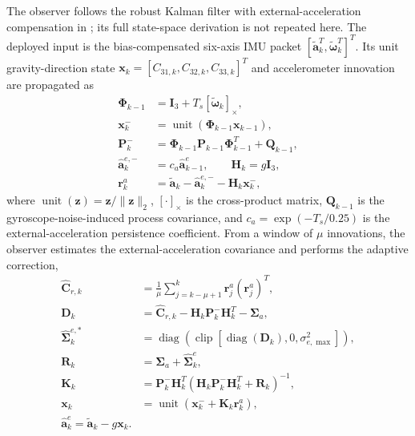\documentclass{ieeeaccess}
\newcommand{\citep}[1]{\cite{#1}}
\begin{document}
The observer follows the robust Kalman filter with external-acceleration compensation in \citep{Chen2024RobustAttitude}; its full state-space derivation is not repeated here. The deployed input is the bias-compensated six-axis IMU packet $[\tilde{\bm a}_k^{T},\tilde{\bm\omega}_k^{T}]^{T}$. Its unit gravity-direction state $\bm x_k=[C_{31,k},C_{32,k},C_{33,k}]^{T}$ and accelerometer innovation are propagated as
\begin{equation}
\begin{aligned}
\bm\Phi_{k-1}&=\bm I_3+T_s[\tilde{\bm\omega}_k]_{\times},\\
\bm x_k^{-}&=\operatorname{unit}(\bm\Phi_{k-1}\bm x_{k-1}),\\
\bm P_k^{-}&=\bm\Phi_{k-1}\bm P_{k-1}\bm\Phi_{k-1}^{T}+\bm Q_{k-1},\\
\hat{\bm a}_{k}^{e,-}&=c_a\hat{\bm a}_{k-1}^{e},\qquad \bm H_k=g\bm I_3,\\
\bm r_k^{a}&=\tilde{\bm a}_k-\hat{\bm a}_{k}^{e,-}-\bm H_k\bm x_k^{-},
\end{aligned}
\label{eq:qualified_observer_prediction}
\end{equation}
where $\operatorname{unit}(\bm z)=\bm z/\|\bm z\|_2$, $[\cdot]_{\times}$ is the cross-product matrix, $\bm Q_{k-1}$ is the gyroscope-noise-induced process covariance, and $c_a=\exp(-T_s/0.25)$ is the external-acceleration persistence coefficient. From a window of $\mu$ innovations, the observer estimates the external-acceleration covariance and performs the adaptive correction,
\begin{equation}
\begin{aligned}
\hat{\bm C}_{r,k}&=\frac{1}{\mu}\sum_{j=k-\mu+1}^{k}
\bm r_j^{a}(\bm r_j^{a})^{T},\\
\bm D_k&=\hat{\bm C}_{r,k}-\bm H_k\bm P_k^{-}\bm H_k^{T}-\bm\Sigma_a,\\
\hat{\bm\Sigma}_{k}^{e,*}&=\operatorname{diag}\!\left(
\operatorname{clip}\!\left[
\operatorname{diag}(\bm D_k),
0,\sigma_{e,\max}^{2}\right]\right),\\
\bm R_k&=\bm\Sigma_a+\hat{\bm\Sigma}_{k}^{e},\\
\bm K_k&=\bm P_k^{-}\bm H_k^{T}
\left(\bm H_k\bm P_k^{-}\bm H_k^{T}+\bm R_k\right)^{-1},\\
\bm x_k&=\operatorname{unit}\!\left(\bm x_k^{-}+\bm K_k\bm r_k^{a}\right),\\
\hat{\bm a}_{k}^{e}=\tilde{\bm a}_k-g\bm x_k.
\end{aligned}
\label{eq:qualified_observer_adaptation}
\end{equation}
\end{document}
